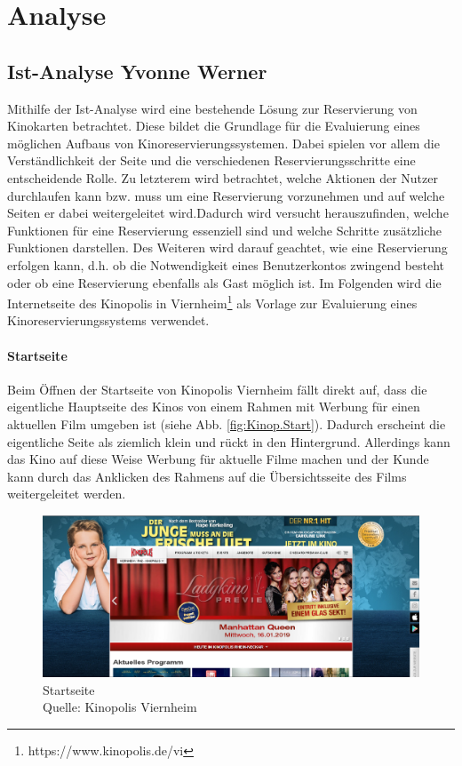 \chapter{Analyse} \label{analyse}
	
	\section[Ist-Analyse]{Ist-Analyse {\hfill \normalsize Yvonne Werner}}\label{istAnalyse}
	Mithilfe der Ist-Analyse wird eine bestehende Lösung zur Reservierung von Kinokarten betrachtet. Diese bildet die Grundlage für die Evaluierung eines möglichen Aufbaus von Kinoreservierungssystemen. Dabei spielen vor allem die Verständlichkeit der Seite und die verschiedenen Reservierungsschritte eine entscheidende Rolle. Zu letzterem wird betrachtet, welche Aktionen der Nutzer durchlaufen kann bzw. muss um eine Reservierung vorzunehmen und auf welche Seiten er dabei weitergeleitet wird.Dadurch wird versucht herauszufinden, welche Funktionen für eine Reservierung essenziell sind und welche Schritte zusätzliche Funktionen darstellen. Des Weiteren wird darauf geachtet, wie eine Reservierung erfolgen kann, d.h. ob die Notwendigkeit eines Benutzerkontos zwingend besteht oder ob eine Reservierung ebenfalls als Gast möglich ist. 
	Im Folgenden wird die Internetseite des Kinopolis in Viernheim\footnote{https://www.kinopolis.de/vi} als Vorlage zur Evaluierung eines Kinoreservierungssystems verwendet. 
	
	\subsubsection{Startseite}
	Beim Öffnen der Startseite von Kinopolis Viernheim fällt direkt auf, dass die eigentliche Hauptseite des Kinos von einem Rahmen mit Werbung für einen aktuellen Film umgeben ist (siehe Abb. \vref{fig:Kinop.Start}). Dadurch erscheint die eigentliche Seite als ziemlich klein und rückt in den Hintergrund. Allerdings kann das Kino auf diese Weise Werbung für aktuelle Filme machen und der Kunde kann durch das Anklicken des Rahmens  auf die Übersichtsseite des Films weitergeleitet werden. 
	\begin{figure}[H]
		\centering 
		\includegraphics[width=14cm]{img/Kinopolis_MA_Startseite.png}
		\captionsetup{format=hang}
		\centering\caption[Startseite]{\label{fig:Kinop.Start}Startseite \\Quelle: Kinopolis Viernheim}
	\end{figure} 
	
